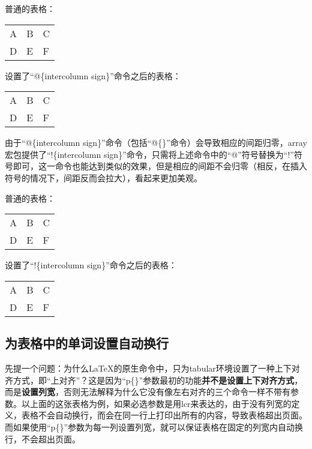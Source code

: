 ﻿\documentclass{article}
\begin{document}
    普通的表格：

    \mbox{}

    \begin{tabular}{l|l|l}
        A&B&C\\
        D&E&F\\
    \end{tabular}

    \mbox{}

    设置了``@\{intercolumn sign\}''命令之后的表格：

    \mbox{}

    \begin{tabular}{l@{-}l@{|}l}
        A&B&C\\
        D&E&F\\
    \end{tabular}
    
    \mbox{}

    由于``@\{intercolumn sign\}''命令（包括``@\{\}''命令）会导致相应的间距归零，array宏包提供了``!\{intercolumn sign\}''命令，只需将上述命令中的``@''符号替换为``!''符号即可，这一命令也能达到类似的效果，但是相应的间距不会归零（相反，在插入符号的情况下，间距反而会拉大），看起来更加美观。

    \mbox{}

    普通的表格：

    \begin{tabular}{l|l|l}
        A&B&C\\
        D&E&F\\
    \end{tabular}

    \mbox{}

    设置了``!\{intercolumn sign\}''命令之后的表格：
    
    \mbox{}

    \begin{tabular}{l!{-}l!{|}l}
        A&B&C\\
        D&E&F\\
    \end{tabular}

\subsection{为表格中的单词设置自动换行}
    先提一个问题：为什么\LaTeX 的原生命令中，只为tabular环境设置了一种上下对齐方式，即``上对齐''？这是因为``p\{\}''参数最初的功能\textbf{并不是设置上下对齐方式}，而是\textbf{设置列宽}，否则无法解释为什么它没有像左右对齐的三个命令一样不带有参数。以上面的这张表格为例，如果必选参数是用lcr来表达的，由于没有列宽的定义，表格不会自动换行，而会在同一行上打印出所有的内容，导致表格超出页面。而如果使用``p\{\}''参数为每一列设置列宽，就可以保证表格在固定的列宽内自动换行，不会超出页面。
\end{document}
